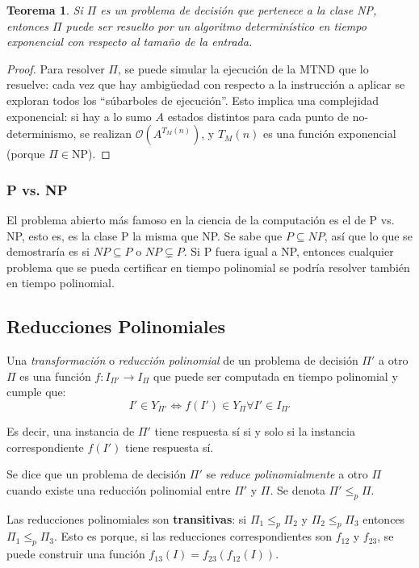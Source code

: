 \documentclass[a4paper]{report}
\newcommand{\BigO}[1]{\ensuremath{\mathcal{O}(#1)}}
\newtheorem*{theorem*}{Teorema}
\begin{document}
\begin{theorem*}
    Si $\Pi$ es un problema de decisión que pertenece a la clase NP, entonces $\Pi$ puede ser resuelto por un algoritmo determinístico en tiempo exponencial con respecto al tamaño de la entrada.
\end{theorem*}
\begin{proof}
    Para resolver $\Pi$, se puede simular la ejecución de la MTND que lo resuelve: cada vez que hay ambigüedad con respecto a la instrucción a aplicar se exploran todos los ``súbarboles de ejecución''. Esto implica una complejidad exponencial: si hay a lo sumo $A$ estados distintos para cada punto de no-determinismo, se realizan \BigO{A^{T_M(n)}}, y $T_M(n)$ es una función exponencial (porque $\Pi \in \text{NP}$).
\end{proof}

\subsubsection{P vs. NP}

El problema abierto más famoso en la ciencia de la computación es el de P vs. NP, esto es, es la clase P la misma que NP. Se sabe que $P \subseteq NP$, así que lo que se demostraría es si $NP \subseteq P$ o $NP \subsetneq P$. Si P fuera igual a NP, entonces cualquier problema que se pueda certificar en tiempo polinomial se podría resolver también en tiempo polinomial.

\subsection{Reducciones Polinomiales}
\label{reducciones}

Una \textit{transformación} o \textit{reducción polinomial} de un problema de decisión $\Pi'$ a otro $\Pi$ es una función $f: I_{\Pi'} \longrightarrow I_{\Pi}$ que puede ser computada en tiempo polinomial y cumple que:
    $$I' \in Y_{\Pi'} \iff f(I') \in Y_{\Pi} \forall I' \in I_{\Pi'}$$

Es decir, una instancia de $\Pi'$ tiene respuesta sí si y solo si la instancia correspondiente $f(I')$ tiene respuesta sí.

Se dice que un problema de decisión $\Pi'$ se \textit{reduce polinomialmente} a otro $\Pi$ cuando existe una reducción polinomial entre $\Pi'$ y $\Pi$. Se denota $\Pi' \leq_p \Pi$.

Las reducciones polinomiales son \textbf{transitivas}: si $\Pi_1 \leq_p \Pi_2$ y $\Pi_2 \leq_p \Pi_3$ entonces $\Pi_1 \leq_p \Pi_3$. Esto es porque, si las reducciones correspondientes son $f_{12}$ y $f_{23}$, se puede construir una función $f_{13}(I) = f_{23}(f_{12}(I))$. 
\end{document}
